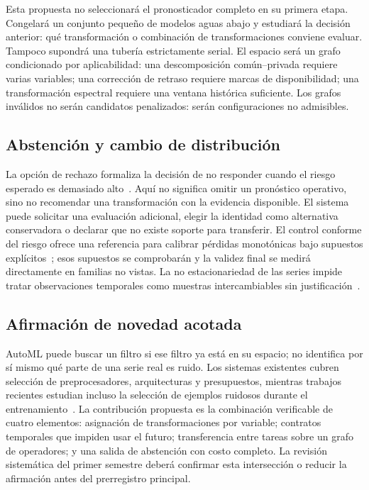 \documentclass[11pt,letterpaper]{article}
\begin{document}
Esta propuesta no seleccionará el pronosticador completo en su primera etapa.
Congelará un conjunto pequeño de modelos aguas abajo y estudiará la decisión anterior: qué transformación o combinación de transformaciones conviene evaluar.
Tampoco supondrá una tubería estrictamente serial.
El espacio será un grafo condicionado por aplicabilidad: una descomposición común--privada requiere varias variables; una corrección de retraso requiere marcas de disponibilidad; una transformación espectral requiere una ventana histórica suficiente.
Los grafos inválidos no serán candidatos penalizados: serán configuraciones no admisibles.

\subsection{Abstención y cambio de distribución}

La opción de rechazo formaliza la decisión de no responder cuando el riesgo esperado es demasiado alto~\cite{chow1970reject}.
Aquí no significa omitir un pronóstico operativo, sino no recomendar una transformación con la evidencia disponible.
El sistema puede solicitar una evaluación adicional, elegir la identidad como alternativa conservadora o declarar que no existe soporte para transferir.
El control conforme del riesgo ofrece una referencia para calibrar pérdidas monotónicas bajo supuestos explícitos~\cite{angelopoulos2024crc}; esos supuestos se comprobarán y la validez final se medirá directamente en familias no vistas.
La no estacionariedad de las series impide tratar observaciones temporales como muestras intercambiables sin justificación~\cite{kuznetsov2016online}.

\subsection{Afirmación de novedad acotada}

AutoML puede buscar un filtro si ese filtro ya está en su espacio; no identifica por sí mismo qué parte de una serie real es ruido.
Los sistemas existentes cubren selección de preprocesadores, arquitecturas y presupuestos, mientras trabajos recientes estudian incluso la selección de ejemplos ruidosos durante el entrenamiento~\cite{taga2026faf}.
La contribución propuesta es la combinación verificable de cuatro elementos: asignación de transformaciones por variable; contratos temporales que impiden usar el futuro; transferencia entre tareas sobre un grafo de operadores; y una salida de abstención con costo completo.
La revisión sistemática del primer semestre deberá confirmar esta intersección o reducir la afirmación antes del prerregistro principal.
\end{document}
